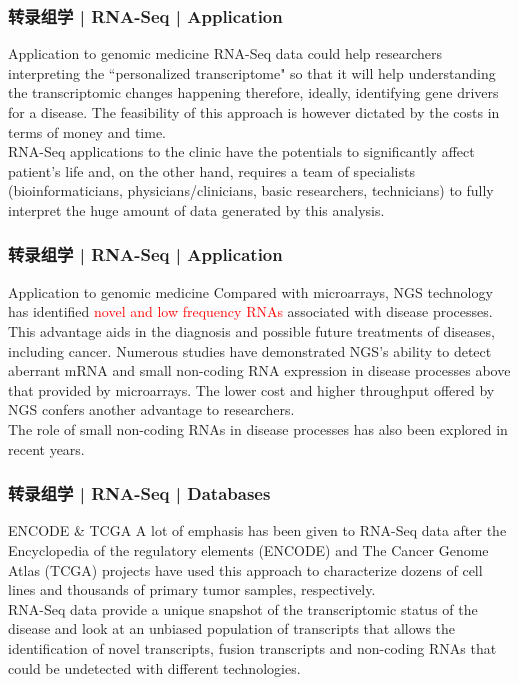 \begin{frame}
  \frametitle{转录组学 | RNA-Seq | Application}
  \begin{block}{Application to genomic medicine}
  RNA-Seq data could help researchers interpreting the ``personalized transcriptome" so that it will help understanding the transcriptomic changes happening therefore, ideally, identifying gene drivers for a disease. The feasibility of this approach is however dictated by the costs in terms of money and time.\\
  \vspace{1em}
  RNA-Seq applications to the clinic have the potentials to significantly affect patient's life and, on the other hand, requires a team of specialists (bioinformaticians, physicians/clinicians, basic researchers, technicians) to fully interpret the huge amount of data generated by this analysis.
  \end{block}
\end{frame}

\begin{frame}
  \frametitle{转录组学 | RNA-Seq | Application}
  \begin{block}{Application to genomic medicine}
    Compared with microarrays, NGS technology has identified \textcolor{red}{novel and low frequency RNAs} associated with disease processes. This advantage aids in the diagnosis and possible future treatments of diseases, including cancer. Numerous studies have demonstrated NGS's ability to detect aberrant mRNA and small non-coding RNA expression in disease processes above that provided by microarrays. The lower cost and higher throughput offered by NGS confers another advantage to researchers.\\
  \vspace{1em}
  The role of small non-coding RNAs in disease processes has also been explored in recent years.
  \end{block}
\end{frame}

\begin{frame}
  \frametitle{转录组学 | RNA-Seq | Databases}
  \begin{block}{ENCODE \& TCGA}
 A lot of emphasis has been given to RNA-Seq data after the Encyclopedia of the regulatory elements (ENCODE) and The Cancer Genome Atlas (TCGA) projects have used this approach to characterize dozens of cell lines and thousands of primary tumor samples, respectively.\\
 \vspace{1em}
 RNA-Seq data provide a unique snapshot of the transcriptomic status of the disease and look at an unbiased population of transcripts that allows the identification of novel transcripts, fusion transcripts and non-coding RNAs that could be undetected with different technologies.
  \end{block}
\end{frame}

